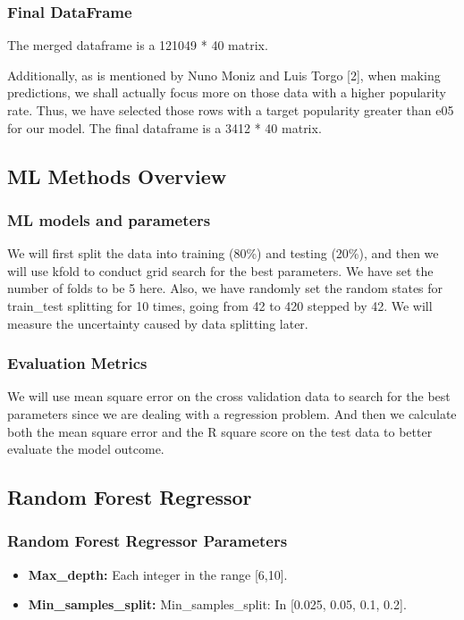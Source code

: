 \documentclass{article}
\begin{document}
\subsubsection{Final DataFrame}
The merged dataframe is a 121049 * 40 matrix.\par
Additionally, as is mentioned by Nuno Moniz and Luis Torgo [2], when making predictions, we shall actually focus more on those data with a higher popularity rate. Thus, we have selected those rows with a target popularity greater than e05 for our model. The final dataframe is a 3412 * 40 matrix.

\subsection{ML Methods Overview}
\subsubsection{ML models and parameters}
We will first split the data into training (80\%) and testing (20\%), and then we will use kfold to conduct grid search for the best parameters. We have set the number of folds to be 5 here. Also, we have randomly set the random states for train\_test splitting for 10 times, going from 42 to 420 stepped by 42. We will measure the uncertainty caused by data splitting later.
\subsubsection{Evaluation Metrics}
We will use mean square error on the cross validation data to search for the best parameters since we are dealing with a regression problem. And then we calculate both the mean square error and the R square score on the test data to better evaluate the model outcome.

\subsection{Random Forest Regressor}

\subsubsection{Random Forest Regressor Parameters}
\begin{itemize}
\item \textbf{Max\_depth:}
Each integer in the range [6,10].
\item \textbf{Min\_samples\_split:}
Min\_samples\_split: In [0.025, 0.05, 0.1, 0.2].
\end{itemize}
\end{document}
